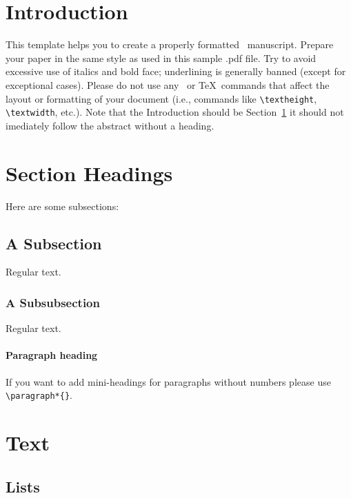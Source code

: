 \documentclass[ecta,nameyear,draft]{econsocart}
\theoremstyle{plain}
\theoremstyle{remark}
\begin{document}
\section{Introduction}\label{s1}

This template helps you to create a properly formatted \LaTeXe\ manuscript.
Prepare your paper in the same style as used in this sample .pdf file.
Try to avoid excessive use of italics and bold face; underlining is generally banned (except for exceptional cases). Please do not use any \LaTeXe\ or \TeX\ commands that affect the layout or formatting of your document (i.e., commands like \verb|\textheight|, \verb|\textwidth|, etc.). Note that the Introduction should be Section~\ref{s1} it should not imediately follow the abstract without a heading.

\section{Section Headings}
Here are some subsections:
\subsection{A Subsection}
Regular text.
\subsubsection{A Subsubsection}
Regular text.

\paragraph*{Paragraph heading} If you want to add mini-headings for paragraphs without numbers please use \verb|\paragraph*{}|.

\section{Text}

\subsection{Lists}
\end{document}
